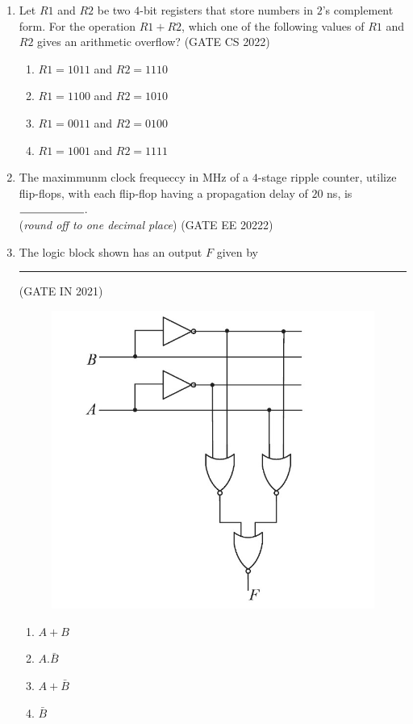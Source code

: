 \begin{enumerate}
\item Let $R1$ and $R2$ be two $4$-bit registers that store numbers in $2$’s complement form.
For the operation $R1+R2$, which one of the following values of $R1$ and $R2$ gives an
arithmetic overflow?
\hfill{(GATE CS 2022)}

    \begin{enumerate}
        \item $R1 = 1011$ and $R2 = 1110$
        \item $R1 = 1100$ and $R2 = 1010$
        \item $R1 = 0011$ and $R2 = 0100$
        \item $R1 = 1001$ and $R2 = 1111$
    \end{enumerate}


\item The maximmunm clock frequeccy in MHz of a $4$-stage ripple counter, utilize flip-flops, with each flip-flop having a propagation delay of $20$ ns, is $\rule{2cm}{0.15mm}$.\\
(\textit{round off to one decimal place})
\hfill{(GATE EE 20222)}

\item The logic block shown has an output $F$ given by \rule{2cm}{0.15mm}
\hfill{(GATE IN 2021)}
\begin{figure}[H]
\centering
\includegraphics[width=\columnwidth]{figs/gatemage.jpg}
\end{figure}
\begin{enumerate}
	\item$A+B$
	\item$A.\bar{B}$
	\item$A+\bar{B}$
	\item$\bar{B}$
\end{enumerate}


\end{enumerate}
